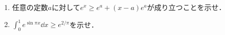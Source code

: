 \begin{enumerate}
  \item 任意の定数$a$に対して$e^x\ge e^a+(x-a)e^a$が成り立つことを示せ．
  \item ${\displaystyle \int_0^1 e^{\sin \pi x} \dd x \ge e^{2/\pi} }$を示せ．
\end{enumerate}